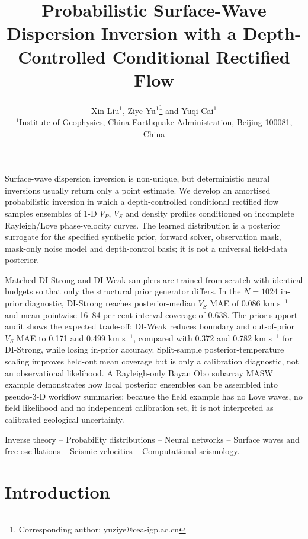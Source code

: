 \documentclass[referee]{gji}
\title[Probabilistic surface-wave inversion]
  {Probabilistic Surface-Wave Dispersion Inversion with a Depth-Controlled Conditional Rectified Flow}
\author[X. Liu et al.]
  {Xin Liu$^1$, Ziye Yu$^1$\thanks{Corresponding author: yuziye@cea-igp.ac.cn}
  and Yuqi Cai$^1$\\
  $^1$Institute of Geophysics, China Earthquake Administration, Beijing 100081, China
  }
\date{}
\begin{document}
\label{firstpage}
\maketitle
\linenumbers
\pagestyle{plain}

\begin{summary}
Surface-wave dispersion inversion is non-unique, but deterministic neural inversions usually return only a point estimate. We develop an amortised probabilistic inversion in which a depth-controlled conditional rectified flow samples ensembles of 1-D $V_P$, $V_S$ and density profiles conditioned on incomplete Rayleigh/Love phase-velocity curves. The learned distribution is a posterior surrogate for the specified synthetic prior, forward solver, observation mask, mask-only noise model and depth-control basis; it is not a universal field-data posterior.

Matched DI-Strong and DI-Weak samplers are trained from scratch with identical budgets so that only the structural prior generator differs. In the $N=1024$ in-prior diagnostic, DI-Strong reaches posterior-median $V_S$ MAE of 0.086 km s$^{-1}$ and mean pointwise 16--84 per cent interval coverage of 0.638. The prior-support audit shows the expected trade-off: DI-Weak reduces boundary and out-of-prior $V_S$ MAE to 0.171 and 0.499 km s$^{-1}$, compared with 0.372 and 0.782 km s$^{-1}$ for DI-Strong, while losing in-prior accuracy. Split-sample posterior-temperature scaling improves held-out mean coverage but is only a calibration diagnostic, not an observational likelihood. A Rayleigh-only Bayan Obo subarray MASW example \citep{Yang2025BayanOboDataset} demonstrates how local posterior ensembles can be assembled into pseudo-3-D workflow summaries; because the field example has no Love waves, no field likelihood and no independent calibration set, it is not interpreted as calibrated geological uncertainty.
\end{summary}

\begin{keywords}
Inverse theory -- Probability distributions -- Neural networks -- Surface waves and free oscillations -- Seismic velocities -- Computational seismology.
\end{keywords}

\section{Introduction}
\end{document}

